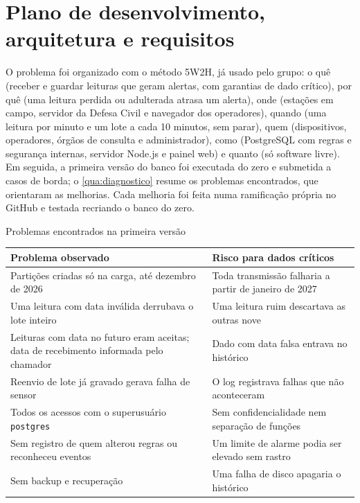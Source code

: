 \chapter{Plano de desenvolvimento, arquitetura e requisitos}\label{cap:arquitetura}

O problema foi organizado com o método 5W2H, já usado pelo grupo: o quê (receber e guardar leituras que geram alertas, com garantias de dado crítico), por quê (uma leitura perdida ou adulterada atrasa um alerta), onde (estações em campo, servidor da Defesa Civil e navegador dos operadores), quando (uma leitura por minuto e um lote a cada 10 minutos, sem parar), quem (dispositivos, operadores, órgãos de consulta e administrador), como (PostgreSQL com regras e segurança internas, servidor Node.js e painel web) e quanto (só software livre). Em seguida, a primeira versão do banco foi executada do zero e submetida a casos de borda; o \autoref{qua:diagnostico} resume os problemas encontrados, que orientaram as melhorias. Cada melhoria foi feita numa ramificação própria no GitHub e testada recriando o banco do zero.

\begin{quadro}[htb]
  \caption{Problemas encontrados na primeira versão}\label{qua:diagnostico}
  \footnotesize
  \begin{tabularx}{\textwidth}{|L{5.9cm}|Y|}
    \hline
    \textbf{Problema observado} & \textbf{Risco para dados críticos} \\ \hline
    Partições criadas só na carga, até dezembro de 2026 & Toda transmissão falharia a partir de janeiro de 2027 \\ \hline
    Uma leitura com data inválida derrubava o lote inteiro & Uma leitura ruim descartava as outras nove \\ \hline
    Leituras com data no futuro eram aceitas; data de recebimento informada pelo chamador & Dado com data falsa entrava no histórico \\ \hline
    Reenvio de lote já gravado gerava falha de sensor & O log registrava falhas que não aconteceram \\ \hline
    Todos os acessos com o superusuário \texttt{postgres} & Sem confidencialidade nem separação de funções \\ \hline
    Sem registro de quem alterou regras ou reconheceu eventos & Um limite de alarme podia ser elevado sem rastro \\ \hline
    Sem backup e recuperação & Uma falha de disco apagaria o histórico \\ \hline
  \end{tabularx}
\end{quadro}

